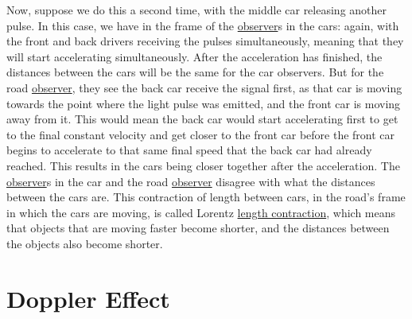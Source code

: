 Now, suppose we do this a second time, with the middle car releasing another pulse.
In this case, we have in the frame of the \hyperlink{def-observer}{observer}s in the cars: again, with the front and back drivers receiving the pulses simultaneously, meaning that they will start accelerating simultaneously.
After the acceleration has finished, the distances between the cars will be the same for the car observers.
But for the road \hyperlink{def-observer}{observer}, they see the back car receive the signal first, as that car is moving towards the point where the light pulse was emitted, and the front car is moving away from it.
This would mean the back car would start accelerating first to get to the final constant velocity and get closer to the front car before the front car begins to accelerate to that same final speed that the back car had already reached.
This results in the cars being closer together after the acceleration.
The \hyperlink{def-observer}{observer}s in the car and the road \hyperlink{def-observer}{observer} disagree with what the distances between the cars are.
This contraction of length between cars, in the road's frame in which the cars are moving, is called Lorentz \hyperlink{def-length-contraction}{length contraction}, which means that objects that are moving faster become shorter, and the distances between the objects also become shorter.

\section{Doppler Effect} \label{sect: Intro Doppler Effect}

